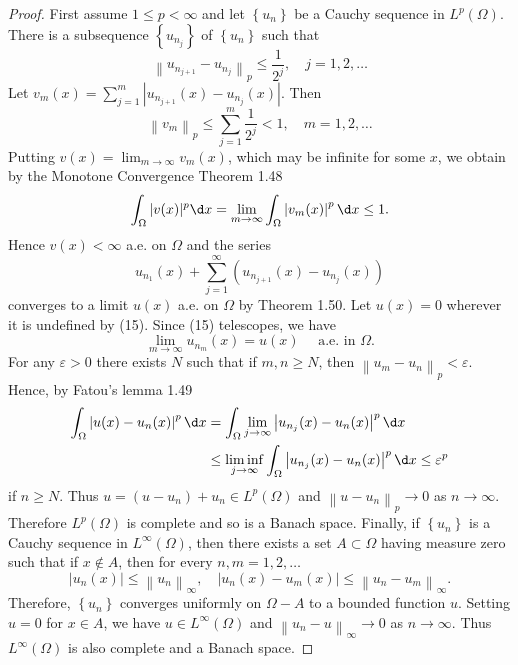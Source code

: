 \begin{proof}
  First assume $1 \leq p<\infty$ and let $\left\{u_n\right\}$ be a Cauchy sequence in $L^p(\Omega)$. There is a subsequence $\left\{u_{n_j}\right\}$ of $\left\{u_n\right\}$ such that
  \[
  \left\|u_{n_{j+1}}-u_{n_j}\right\|_p \leq \frac{1}{2^j}, \quad j=1,2, \ldots
  \]
  Let $v_m(x)=\sum_{j=1}^m\left|u_{n_{j+1}}(x)-u_{n_j}(x)\right|$. Then
  \[
  \left\|v_m\right\|_p \leq \sum_{j=1}^m \frac{1}{2^j}<1, \quad m=1,2, \ldots
  \]
  Putting $v(x)=\lim _{m \rightarrow \infty} v_m(x)$, which may be infinite for some $x$, we obtain by the Monotone Convergence Theorem 1.48
  \[
  \int_{\Omega}|v(x)|^p \d x=\lim _{m \rightarrow \infty} \int_{\Omega}\left|v_m(x)\right|^p \d x \leq 1 .
  \]
  Hence $v(x)<\infty$ a.e. on $\Omega$ and the series
  \begin{equation}\label{eq:2.15}
  u_{n_1}(x)+\sum_{j=1}^{\infty}\left(u_{n_{j+1}}(x)-u_{n_j}(x)\right)
  \end{equation}
  converges to a limit $u(x)$ a.e. on $\Omega$ by Theorem 1.50. Let $u(x)=0$ wherever it is undefined by (15). Since (15) telescopes, we have
  \[
  \lim _{m \rightarrow \infty} u_{n_m}(x)=u(x) \quad \text { a.e. in } \Omega.
  \]
  For any $\varepsilon>0$ there exists $N$ such that if $m, n \geq N$, then $\left\|u_m-u_n\right\|_p<\varepsilon$. Hence, by Fatou's lemma 1.49
  \[
  \begin{aligned}
  \int_{\Omega}\left|u(x)-u_n(x)\right|^p \d x & =\int_{\Omega} \lim _{j \rightarrow \infty}\left|u_{n_j}(x)-u_n(x)\right|^p \d x \\
  & \leq \liminf _{j \rightarrow \infty} \int_{\Omega}\left|u_{n_j}(x)-u_n(x)\right|^p \d x \leq \varepsilon^p
  \end{aligned}
  \]
  if $n \geq N$. Thus $u=\left(u-u_n\right)+u_n \in L^p(\Omega)$ and $\left\|u-u_n\right\|_p \rightarrow 0$ as $n \rightarrow \infty$. Therefore $L^p(\Omega)$ is complete and so is a Banach space.
  Finally, if $\left\{u_n\right\}$ is a Cauchy sequence in $L^{\infty}(\Omega)$, then there exists a set $A \subset \Omega$ having measure zero such that if $x \notin A$, then for every $n, m=1,2, \ldots$
  \[
  \left|u_n(x)\right| \leq\left\|u_n\right\|_{\infty}, \quad\left|u_n(x)-u_m(x)\right| \leq\left\|u_n-u_m\right\|_{\infty} .
  \]
  Therefore, $\left\{u_n\right\}$ converges uniformly on $\Omega-A$ to a bounded function $u$. Setting $u=0$ for $x \in A$, we have $u \in L^{\infty}(\Omega)$ and $\left\|u_n-u\right\|_{\infty} \rightarrow 0$ as $n \rightarrow \infty$. Thus $L^{\infty}(\Omega)$ is also complete and a Banach space.
\end{proof}

